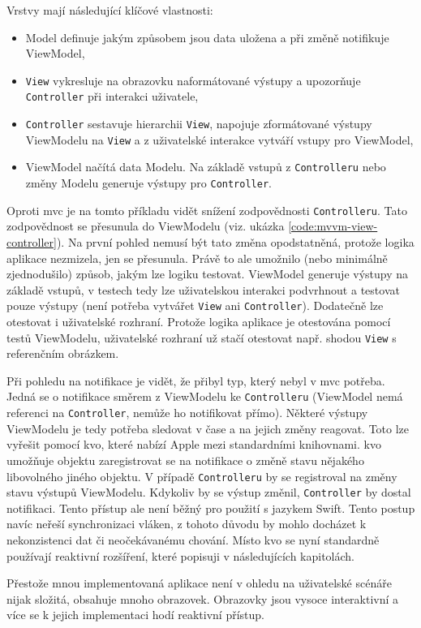 Vrstvy mají následující klíčové vlastnosti:
\begin{itemize}
  \item Model definuje jakým způsobem jsou data uložena a při změně notifikuje ViewModel,
  \item \texttt{View} vykresluje na obrazovku naformátované výstupy a upozorňuje \texttt{Controller} při interakci uživatele,
  \item \texttt{Controller} sestavuje hierarchii \texttt{View}, napojuje zformátované výstupy ViewModelu na \texttt{View} a z uživatelské interakce vytváří vstupy pro ViewModel,
  \item ViewModel načítá data Modelu. Na základě vstupů z \texttt{Controlleru} nebo změny Modelu generuje výstupy pro \texttt{Controller}.
\end{itemize}

Oproti \acrshort{mvc} je na tomto příkladu vidět snížení zodpovědnosti \texttt{Controlleru}.
Tato zodpovědnost se přesunula do ViewModelu (viz. ukázka \ref{code:mvvm-view-controller}).
Na první pohled nemusí být tato změna opodstatněná, protože logika aplikace nezmizela, jen se přesunula.
Právě to ale umožnilo (nebo minimálně zjednodušilo) způsob, jakým lze logiku testovat.
ViewModel generuje výstupy na základě vstupů, v testech tedy lze uživatelskou interakci podvrhnout a testovat pouze výstupy (není potřeba vytvářet \texttt{View} ani \texttt{Controller}).
Dodatečně lze otestovat i uživatelské rozhraní.
Protože logika aplikace je otestována pomocí testů ViewModelu, uživatelské rozhraní už stačí otestovat např. shodou \texttt{View} s referenčním obrázkem.


Při pohledu na notifikace je vidět, že přibyl typ, který nebyl v \acrshort{mvc} potřeba.
Jedná se o notifikace směrem z ViewModelu ke \texttt{Controlleru} (ViewModel nemá referenci na \texttt{Controller}, nemůže ho notifikovat přímo).
Některé výstupy ViewModelu je tedy potřeba sledovat v čase a na jejich změny reagovat.
Toto lze vyřešit pomocí \acrfull{kvo}, které nabízí Apple mezi standardními knihovnami.
\acrshort{kvo} umožňuje objektu zaregistrovat se na notifikace o změně stavu nějakého libovolného jiného objektu.
V případě \texttt{Controlleru} by se registroval na změny stavu výstupů ViewModelu.
Kdykoliv by se výstup změnil, \texttt{Controller} by dostal notifikaci.
Tento přístup ale není běžný pro použití s jazykem Swift.
Tento postup navíc neřeší synchronizaci vláken, z tohoto důvodu by mohlo docházet k nekonzistenci dat či neočekávanému chování.
Místo \acrshort{kvo} se nyní standardně používají reaktivní rozšíření, které popisuji v následujících kapitolách.

Přestože mnou implementovaná aplikace není v ohledu na uživatelské scénáře nijak složitá, obsahuje mnoho obrazovek.
Obrazovky jsou vysoce interaktivní a více se k jejich implementaci hodí reaktivní přístup.
